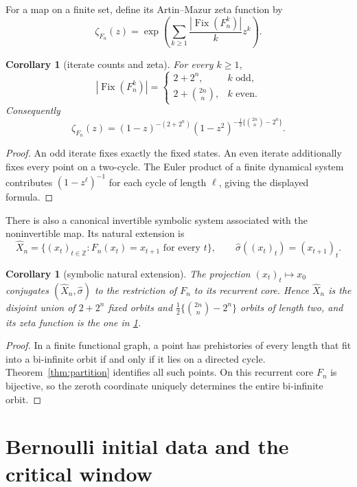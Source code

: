 \documentclass[11pt,a4paper]{amsart}
\newtheorem{corollary}[theorem]{Corollary}
\theoremstyle{definition}
\theoremstyle{remark}
\newcommand{\Fix}{\operatorname{Fix}}
\begin{document}
For a map on a finite set, define its Artin--Mazur zeta function by
\[
 \zeta_{F_n}(z)
 =\exp\left(\sum_{k\geq1}\frac{|\Fix(F_n^k)|}{k}z^k\right).
\]

\begin{corollary}[iterate counts and zeta]\label{cor:zeta}
For every $k\geq1$,
\[
 |\Fix(F_n^k)|=
 \begin{cases}
 2+2^n,&k\text{ odd},\\
 2+\binom{2n}{n},&k\text{ even}.
 \end{cases}
\]
Consequently
\[
 \zeta_{F_n}(z)
 =(1-z)^{-(2+2^n)}
  (1-z^2)^{-\frac12\{\binom{2n}{n}-2^n\}}.
\]
\end{corollary}

\begin{proof}
An odd iterate fixes exactly the fixed states.  An even iterate additionally
fixes every point on a two-cycle.  The Euler product of a finite dynamical
system contributes $(1-z^\ell)^{-1}$ for each cycle of length $\ell$, giving
the displayed formula.
\end{proof}

There is also a canonical invertible symbolic system associated with the
noninvertible map.  Its natural extension is
\[
 \widehat X_n
 =\{(x_t)_{t\in\mathbb Z}:F_n(x_t)=x_{t+1}\text{ for every }t\},
 \qquad \widehat\sigma((x_t)_t)=(x_{t+1})_t.
\]

\begin{corollary}[symbolic natural extension]\label{cor:natural}
The projection $(x_t)_t\mapsto x_0$ conjugates
$(\widehat X_n,\widehat\sigma)$ to the restriction of $F_n$ to its recurrent
core.  Hence $\widehat X_n$ is the disjoint union of $2+2^n$ fixed orbits and
$\frac12\{\binom{2n}{n}-2^n\}$ orbits of length two, and its zeta function is
the one in \cref{cor:zeta}.
\end{corollary}

\begin{proof}
In a finite functional graph, a point has prehistories of every length that
fit into a bi-infinite orbit if and only if it lies on a directed cycle.
Theorem~\ref{thm:partition} identifies all such points.  On this recurrent
core $F_n$ is bijective, so the zeroth coordinate uniquely determines the
entire bi-infinite orbit.
\end{proof}

\section{Bernoulli initial data and the critical window}
\end{document}
